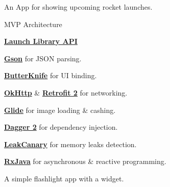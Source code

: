 \documentclass[]{Resume}
\begin{document}
\begin{minipage}[t]{0.66\textwidth}
An App for showing upcoming rocket launches.
\begin{tightemize}
\item MVP Architecture
\item  \textbf{\href{http://launchlibrary.net/}{Launch Library API}}
\item \textbf{\href{http://github.com/google/gson}{Gson}} for JSON parsing.
\item \textbf{\href{http://jakewharton.github.io/butterknife/}{ButterKnife}} for UI binding.
\item \textbf{\href{http://square.github.io/okhttp}{OkHttp}} \& \textbf{\href{http://square.github.io/retrofit}{Retrofit 2}} for networking.
\item \textbf{\href{http://github.com/bumptech/glide}{Glide}} for image loading \& cashing.
\item \textbf{\href{http://github.com/google/dagger}{Dagger 2}} for dependency injection.
\item \textbf{\href{http://github.com/square/leakcanary}{LeakCanary}} for memory leaks detection.
\item \textbf{\href{http://github.com/ReactiveX/RxJava}{RxJava}} for asynchronous \& reactive programming.
\end{tightemize}
\sectionsep

A simple flashlight app with a widget.
\sectionsep



\end{minipage} 
\end{document}
